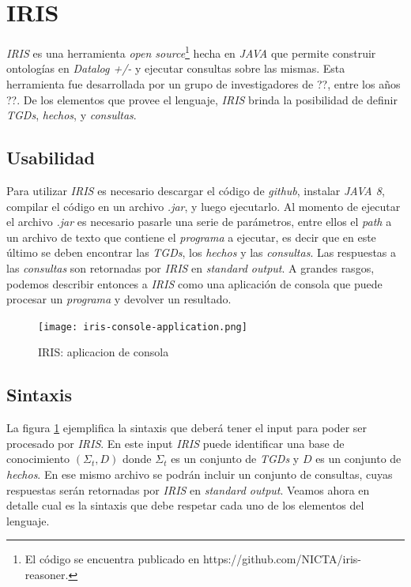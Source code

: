\documentclass[11pt,a4paper,twoside]{tesis}
\begin{document}
\section{IRIS}

\textit{IRIS} es una herramienta \textit{open source}\footnote{El código se encuentra publicado en https://github.com/NICTA/iris-reasoner.} hecha en \textit{JAVA} que permite construir ontologías en \textit{Datalog +/-} y ejecutar consultas sobre las mismas. Esta herramienta fue desarrollada por un grupo de investigadores de ??, entre los años ??. De los elementos que provee el lenguaje, \textit{IRIS} brinda la posibilidad de definir \textit{TGDs}, \textit{hechos}, y \textit{consultas}. 

\subsection{Usabilidad}
Para utilizar \textit{IRIS} es necesario descargar el código de \textit{github}, instalar \textit{JAVA 8}, compilar el código en un archivo \textit{.jar}, y luego ejecutarlo. Al momento de ejecutar el archivo \textit{.jar} es necesario pasarle una serie de parámetros, entre ellos el \textit{path} a un archivo de texto que contiene el \textit{programa} a ejecutar, es decir que en este último se deben encontrar las \textit{TGDs}, los \textit{hechos} y las \textit{consultas}. Las respuestas a las \textit{consultas} son retornadas por \textit{IRIS} en \textit{standard output}. A grandes rasgos, podemos describir entonces a \textit{IRIS} como una aplicación de consola que puede procesar un \textit{programa} y devolver un resultado.

\begin{figure}[ht]
    \texttt{[image: iris-console-application.png]}
    \centering
    \caption{IRIS: aplicacion de consola}
    \label{fig:iris_console_application}
\end{figure}


\subsection{Sintaxis}\label{section_sintaxis}
La figura \ref{fig:iris_console_application} ejemplifica la sintaxis que deberá tener el input para poder ser procesado por \textit{IRIS}. En este input \textit{IRIS} puede identificar una base de conocimiento $(\Sigma_t, D)$ donde $\Sigma_t$ es un conjunto de \textit{TGDs} y $D$ es un conjunto de \textit{hechos}. En ese mismo archivo se podrán incluir un conjunto de consultas, cuyas respuestas serán retornadas por \textit{IRIS} en \textit{standard output}. Veamos ahora en detalle cual es la sintaxis que debe respetar cada uno de los elementos del lenguaje.
\end{document}

